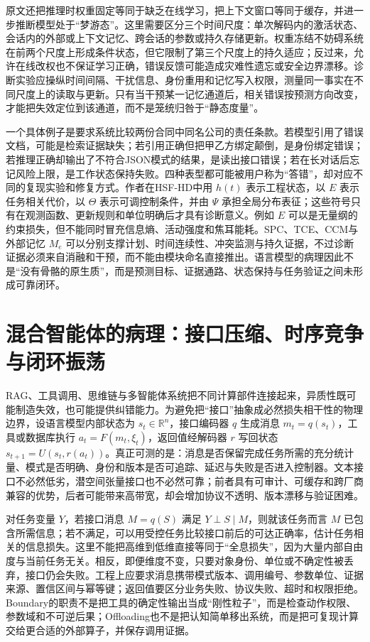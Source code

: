 原文还把推理时权重固定等同于缺乏在线学习，把上下文窗口等同于缓存，并进一步推断模型处于“梦游态”。这里需要区分三个时间尺度：单次解码内的激活状态、会话内的外部或上下文记忆、跨会话的参数或持久存储更新。权重冻结不妨碍系统在前两个尺度上形成条件状态，但它限制了第三个尺度上的持久适应；反过来，允许在线改权也不保证学习正确，错误反馈可能造成灾难性遗忘或安全边界漂移。诊断实验应操纵时间间隔、干扰信息、身份重用和记忆写入权限，测量同一事实在不同尺度上的读取与更新。只有当干预某一记忆通道后，相关错误按预测方向改变，才能把失效定位到该通道，而不是笼统归咎于“静态度量”。

一个具体例子是要求系统比较两份合同中同名公司的责任条款。若模型引用了错误文档，可能是检索证据缺失；若引用正确但把甲乙方绑定颠倒，是身份绑定错误；若推理正确却输出了不符合JSON模式的结果，是读出接口错误；若在长对话后忘记风险上限，是工作状态保持失败。四种表型都可能被用户称为“答错”，却对应不同的复现实验和修复方式。作者在HSF-HD中用 \(h(t)\) 表示工程状态，以 \(E\) 表示任务相关代价，以 \(\Theta\) 表示可调控制条件，并由 \(\Psi\) 承担全局分布表征；这些符号只有在观测函数、更新规则和单位明确后才具有诊断意义。例如 \(E\) 可以是无量纲的约束损失，但不能同时冒充信息熵、活动强度和焦耳能耗。SPC、TCE、CCM与外部记忆 \(M_e\) 可以分别支撑计划、时间连续性、冲突监测与持久证据，不过诊断证据必须来自消融和干预，而不能由模块命名直接推出。语言模型的病理因此不是“没有骨骼的原生质”，而是预测目标、证据通路、状态保持与任务验证之间未形成可靠闭环。

\section{混合智能体的病理：接口压缩、时序竞争与闭环振荡}
\label{sec:section_9642}

RAG、工具调用、思维链与多智能体系统把不同计算部件连接起来，异质性既可能制造失效，也可能提供纠错能力。为避免把“接口”抽象成必然损失相干性的物理边界，设语言模型内部状态为 \(s_t\in\mathbb{R}^{n}\)，接口编码器 \(q\) 生成消息 \(m_t=q(s_t)\)，工具或数据库执行 \(a_t=F(m_t,\xi_t)\)，返回值经解码器 \(r\) 写回状态 \(s_{t+1}=U(s_t,r(a_t))\)。真正可测的是：消息是否保留完成任务所需的充分统计量、模式是否明确、身份和版本是否可追踪、延迟与失败是否进入控制器。文本接口不必然低劣，潜空间张量接口也不必然可靠；前者具有可审计、可缓存和跨厂商兼容的优势，后者可能带来高带宽，却会增加协议不透明、版本漂移与验证困难。

对任务变量 \(Y\)，若接口消息 \(M=q(S)\) 满足 \(Y\perp S\mid M\)，则就该任务而言 \(M\) 已包含所需信息；若不满足，可以用受控任务比较接口前后的可达正确率，估计任务相关的信息损失。这里不能把高维到低维直接等同于“全息损失”，因为大量内部自由度与当前任务无关。相反，即便维度不变，只要对象身份、单位或不确定性被丢弃，接口仍会失败。工程上应要求消息携带模式版本、调用编号、参数单位、证据来源、置信区间与幂等键；返回值要区分业务失败、协议失败、超时和权限拒绝。Boundary的职责不是把工具的确定性输出当成“刚性粒子”，而是检查动作权限、参数域和不可逆后果；Offloading也不是把认知简单移出系统，而是把可复现计算交给更合适的外部算子，并保存调用证据。

